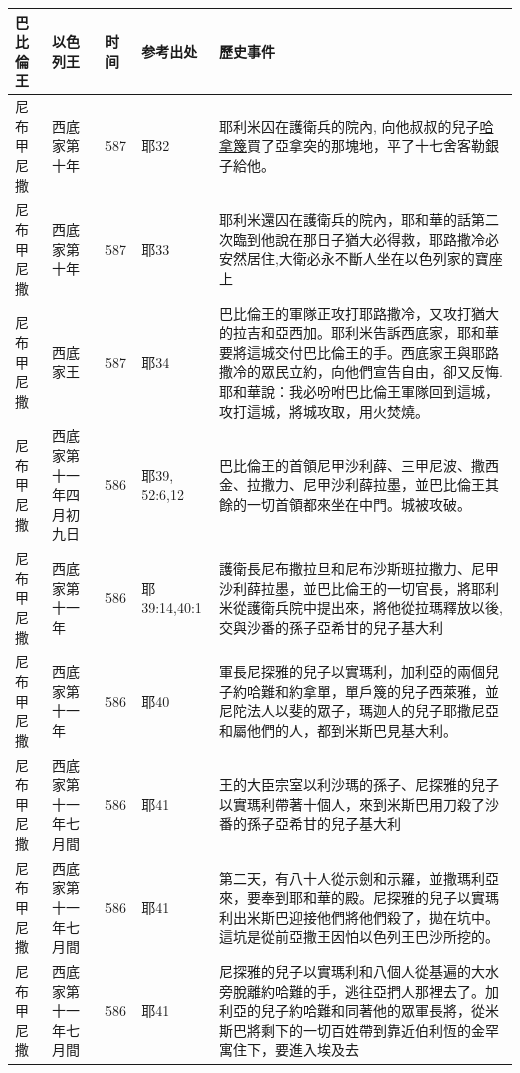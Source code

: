 \begin{table}[!hbp]
\centering 
\begin{tabular}{|p{1.8cm}|p{2cm}|p{1.5cm}|p{1.7cm}|p{8.5cm}| }
\hline
\hline
巴比倫王 &以色列王  & 时间 &参考出处 & 歷史事件   \\\hline


 尼布甲尼撒 &西底家第十年 &587&耶32  & 耶利米囚在護衛兵的院內, 向他叔叔的兒子\underline{哈拿篾}買了亞拿突的那塊地，平了十七舍客勒銀子給他。  \\\hline 
 尼布甲尼撒 &西底家第十年 &587&耶33  & 耶利米還囚在護衛兵的院內，耶和華的話第二次臨到他說在那日子猶大必得救，耶路撒冷必安然居住,大衛必永不斷人坐在以色列家的寶座上    \\\hline  
 尼布甲尼撒& 西底家王&587  &耶34  &巴比倫王的軍隊正攻打耶路撒冷，又攻打猶大的拉吉和亞西加。耶利米告訴西底家，耶和華要將這城交付巴比倫王的手。西底家王與耶路撒冷的眾民立約，向他們宣告自由，卻又反悔. 耶和華說：我必吩咐巴比倫王軍隊回到這城，攻打這城，將城攻取，用火焚燒。 \\\hline
 尼布甲尼撒 &西底家第十一年四月初九日 &586&耶39, 52:6,12 &巴比倫王的首領尼甲沙利薛、三甲尼波、撒西金、拉撒力、尼甲沙利薛拉墨，並巴比倫王其餘的一切首領都來坐在中門。城被攻破。 \\\hline  

尼布甲尼撒 &西底家第十一年  &586&耶39:14,40:1  &護衛長尼布撒拉旦和尼布沙斯班拉撒力、尼甲沙利薛拉墨，並巴比倫王的一切官長，將耶利米從護衛兵院中提出來，將他從拉瑪釋放以後,交與沙番的孫子亞希甘的兒子基大利 \\\hline 

尼布甲尼撒 &西底家第十一年  &586&耶40  &軍長尼探雅的兒子以實瑪利，加利亞的兩個兒子約哈難和約拿單，單戶篾的兒子西萊雅，並尼陀法人以斐的眾子，瑪迦人的兒子耶撒尼亞和屬他們的人，都到米斯巴見基大利。 \\\hline

尼布甲尼撒 &西底家第十一年七月間  &586&耶41  &王的大臣宗室以利沙瑪的孫子、尼探雅的兒子以實瑪利帶著十個人，來到米斯巴用刀殺了沙番的孫子亞希甘的兒子基大利\\\hline

尼布甲尼撒 &西底家第十一年七月間  &586&耶41  &第二天，有八十人從示劍和示羅，並撒瑪利亞來，要奉到耶和華的殿。尼探雅的兒子以實瑪利出米斯巴迎接他們將他們殺了，拋在坑中。這坑是從前亞撒王因怕以色列王巴沙所挖的。 \\\hline
尼布甲尼撒 &西底家第十一年七月間  &586&耶41  &尼探雅的兒子以實瑪利和八個人從基遍的大水旁脫離約哈難的手，逃往亞捫人那裡去了。加利亞的兒子約哈難和同著他的眾軍長將，從米斯巴將剩下的一切百姓帶到靠近伯利恆的金罕寓住下，要進入埃及去\\\hline


\end{tabular}
\end{table}
